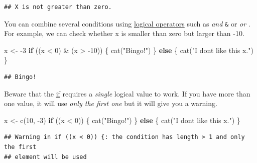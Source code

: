 \documentclass[
]{book}
\newenvironment{Shaded}{\begin{snugshade}}{\end{snugshade}}
\newcommand{\ControlFlowTok}[1]{\textcolor[rgb]{0.13,0.29,0.53}{\textbf{#1}}}
\newcommand{\DecValTok}[1]{\textcolor[rgb]{0.00,0.00,0.81}{#1}}
\newcommand{\FunctionTok}[1]{\textcolor[rgb]{0.00,0.00,0.00}{#1}}
\newcommand{\NormalTok}[1]{#1}
\newcommand{\OtherTok}[1]{\textcolor[rgb]{0.56,0.35,0.01}{#1}}
\newcommand{\SpecialCharTok}[1]{\textcolor[rgb]{0.00,0.00,0.00}{#1}}
\newcommand{\StringTok}[1]{\textcolor[rgb]{0.31,0.60,0.02}{#1}}
\begin{document}
\begin{verbatim}
## X is not greater than zero.
\end{verbatim}

You can combine several conditions using \href{https://stat.ethz.ch/R-manual/R-devel/library/base/html/Logic.html}{logical operators} such as \emph{and} \texttt{\&} or \emph{or} \texttt{\textbar{}}. For example, we can check whether x is smaller than zero but larger than -10.

\begin{Shaded}
\begin{Highlighting}[]
\NormalTok{x }\OtherTok{\textless{}{-}} \SpecialCharTok{{-}}\DecValTok{3}
\ControlFlowTok{if}\NormalTok{ ((x }\SpecialCharTok{\textless{}} \DecValTok{0}\NormalTok{) }\SpecialCharTok{\&}\NormalTok{ (x }\SpecialCharTok{\textgreater{}} \SpecialCharTok{{-}}\DecValTok{10}\NormalTok{)) \{}
  \FunctionTok{cat}\NormalTok{(}\StringTok{"Bingo!"}\NormalTok{)}
\NormalTok{\} }\ControlFlowTok{else}\NormalTok{ \{}
  \FunctionTok{cat}\NormalTok{(}\StringTok{"I don\textquotesingle{}t like this x."}\NormalTok{)}
\NormalTok{\}}
\end{Highlighting}
\end{Shaded}

\begin{verbatim}
## Bingo!
\end{verbatim}

Beware that the \href{https://stat.ethz.ch/R-manual/R-devel/library/base/html/Control.html}{if} requires a \emph{single} logical value to work. If you have more than one value, it will use \emph{only the first one} but it will give you a warning.

\begin{Shaded}
\begin{Highlighting}[]
\NormalTok{x }\OtherTok{\textless{}{-}} \FunctionTok{c}\NormalTok{(}\DecValTok{10}\NormalTok{,  }\SpecialCharTok{{-}}\DecValTok{3}\NormalTok{)}
\ControlFlowTok{if}\NormalTok{ ((x }\SpecialCharTok{\textless{}} \DecValTok{0}\NormalTok{)) \{}
  \FunctionTok{cat}\NormalTok{(}\StringTok{"Bingo!"}\NormalTok{)}
\NormalTok{\} }\ControlFlowTok{else}\NormalTok{ \{}
  \FunctionTok{cat}\NormalTok{(}\StringTok{"I don\textquotesingle{}t like this x."}\NormalTok{)}
\NormalTok{\}}
\end{Highlighting}
\end{Shaded}

\begin{verbatim}
## Warning in if ((x < 0)) {: the condition has length > 1 and only the first
## element will be used
\end{verbatim}
\end{document}
